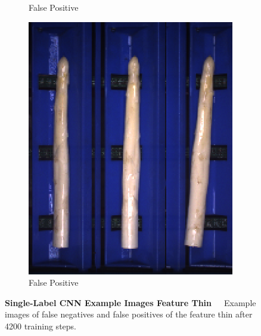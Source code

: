 \begin{figure}[h]
\begin{subfigure}{0.3\textwidth}
		\vspace{-5pt}
		\caption{False Positive}
	\end{subfigure}
	\begin{subfigure}{0.3\textwidth}
		\includegraphics[width=0.9\linewidth]{Figures/appendix/thin_falsepositive_03.png}
		\vspace{-5pt}
		\caption{False Positive}
	\end{subfigure}
	\caption[Single-Label CNN Example Images Feature Thin]{\textbf{Single-Label CNN Example Images Feature Thin}~~~Example images of false negatives and false positives of the feature thin after 4200 training steps.}
	\vspace{-20pt}
    \label{fig:ExampleImagesThin}
\end{figure}

